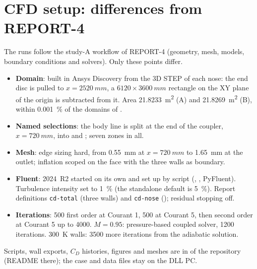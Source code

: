 \section{CFD setup: differences from REPORT-4}
\label{app:setup}

The runs follow the study-A workflow of REPORT-4 (geometry, mesh, models, boundary conditions and
solvers). Only these points differ.

\begin{itemize}
\item \textbf{Domain}: built in Ansys Discovery from the 3D STEP of each nose: the end disc is pulled to
$x = \SI{2520}{mm}$, a $6120 \times \SI{3600}{mm}$ rectangle on the XY plane of the origin is subtracted from
it. Area \SI{21.8233}{m^2} (A) and \SI{21.8269}{m^2} (B), within \SI{0.001}{\percent} of the domains
of .
\item \textbf{Named selections}: the body line is split at the end of the coupler, $x = \SI{720}{mm}$,
into  and ; seven zones in all.
\item \textbf{Mesh}:  edge sizing hard, from \SI{0.55}{mm} at $x = \SI{720}{mm}$ to
\SI{1.65}{mm} at the outlet; inflation scoped on the face with the three walls as boundary.
\item \textbf{Fluent}: 2024~R2 started on its own and set up by script (,
, PyFluent). Turbulence intensity set to \SI{1}{\percent} (the standalone default is
\SI{5}{\percent}). Report definitions \texttt{cd-total} (three walls) and \texttt{cd-nose}
(); residual stopping off.
\item \textbf{Iterations}: 500 first order at Courant 1, 500 at Courant 5, then second order at Courant 5
up to 4000. $M = 0.95$: pressure-based coupled solver, 1200 iterations. \SI{300}{K} walls: 3500 more
iterations from the adiabatic solution.
\end{itemize}

Scripts, wall exports, $C_D$ histories, figures and meshes are in  of the repository
(README there); the case and data files stay on the DLL PC.

